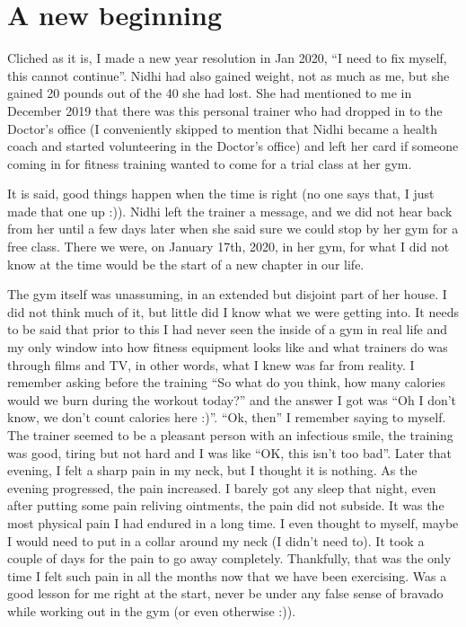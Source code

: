\documentclass[
  oneside]{book}
\begin{document}
\hypertarget{a-new-beginning}{%
\section{A new beginning}\label{a-new-beginning}}

Cliched as it is, I made a new year resolution in Jan 2020, ``I need to fix myself, this cannot continue''. Nidhi had also gained weight, not as much as me, but she gained 20 pounds out of the 40 she had lost. She had mentioned to me in December 2019 that there was this personal trainer who had dropped in to the Doctor's office (I conveniently skipped to mention that Nidhi became a health coach and started volunteering in the Doctor's office) and left her card if someone coming in for fitness training wanted to come for a trial class at her gym.

It is said, good things happen when the time is right (no one says that, I just made that one up :)). Nidhi left the trainer a message, and we did not hear back from her until a few days later when she said sure we could stop by her gym for a free class. There we were, on January 17th, 2020, in her gym, for what I did not know at the time would be the start of a new chapter in our life.

The gym itself was unassuming, in an extended but disjoint part of her house. I did not think much of it, but little did I know what we were getting into. It needs to be said that prior to this I had never seen the inside of a gym in real life and my only window into how fitness equipment looks like and what trainers do was through films and TV, in other words, what I knew was far from reality. I remember asking before the training ``So what do you think, how many calories would we burn during the workout today?'' and the answer I got was ``Oh I don't know, we don't count calories here :)''. ``Ok, then'' I remember saying to myself. The trainer seemed to be a pleasant person with an infectious smile, the training was good, tiring but not hard and I was like ``OK, this isn't too bad''. Later that evening, I felt a sharp pain in my neck, but I thought it is nothing. As the evening progressed, the pain increased. I barely got any sleep that night, even after putting some pain reliving ointments, the pain did not subside. It was the most physical pain I had endured in a long time. I even thought to myself, maybe I would need to put in a collar around my neck (I didn't need to). It took a couple of days for the pain to go away completely. Thankfully, that was the only time I felt such pain in all the months now that we have been exercising. Was a good lesson for me right at the start, never be under any false sense of bravado while working out in the gym (or even otherwise :)).
\end{document}

